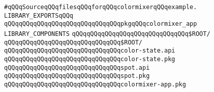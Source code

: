 \label{src/lib/x-kit/tut/colormixer/colormixer-app.lib}
\verb|#qQQqSourceqQQqfilesqQQqforqQQqcolormixerqQQqexample.|\newline
\newline
\verb|LIBRARY_EXPORTSqQQq|\newline
\newline
\verb|qQQqqQQqqQQqqQQqqQQqqQQqqQQqqQQqpkgqQQqcolormixer_app|\newline
\newline
\verb|LIBRARY_COMPONENTS|\newline
\newline
\verb|qQQqqQQqqQQqqQQqqQQqqQQqqQQqqQQq$ROOT/|\newline
\verb|qQQqqQQqqQQqqQQqqQQqqQQqqQQqqQQq$ROOT/|\newline
\newline
\verb|qQQqqQQqqQQqqQQqqQQqqQQqqQQqqQQqcolor-state.api|\newline
\verb|qQQqqQQqqQQqqQQqqQQqqQQqqQQqqQQqcolor-state.pkg|\newline
\newline
\verb|qQQqqQQqqQQqqQQqqQQqqQQqqQQqqQQqspot.api|\newline
\verb|qQQqqQQqqQQqqQQqqQQqqQQqqQQqqQQqspot.pkg|\newline
\newline
\verb|qQQqqQQqqQQqqQQqqQQqqQQqqQQqqQQqcolormixer-app.pkg|\newline

